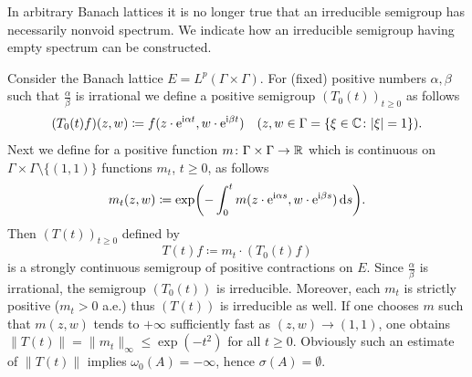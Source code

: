 In arbitrary Banach lattices it is no longer true that an irreducible semigroup has necessarily nonvoid spectrum.
We indicate how an irreducible semigroup having empty spectrum can be constructed.
\begin{example}\label{ex:c3-3.6}

Consider the Banach lattice $E = L^{p}(\Gamma\times\Gamma)$.
For (fixed) positive numbers $\alpha,\beta$ such that $\frac{\alpha}{\beta}$ is irrational we define a positive semigroup $(T_{0}(t))_{t\geq 0}$ as follows
\begin{equation}\label{eq:c3-3.9}
	(T_{0}(t)f)(z,w) \coloneq f(z\cdot \mathrm{e}^{\mathrm{i}\alpha t},w\cdot \mathrm{e}^{\mathrm{i}\beta t}) \quad (z,w \in \Gamma = \{\xi\in\mathbb{C} \colon |\xi|=1\}) .
\end{equation}
Next we define for a positive function $m \colon \Gamma\times\Gamma \to \mathbb{R} $ which is continuous on $\Gamma\times\Gamma\setminus\{(1,1)\}$ functions $m_{t}$, $t\geq 0$, as follows
\begin{equation}\label{eq:c3-3.10}
	m_{t}(z,w) \coloneq \exp\mleft(-\int_{0}^{t} m(z\cdot \eu^{\im\alpha s},w\cdot \eu^{\im\beta s})\ds \mright) .
\end{equation}
Then $(T(t))_{t\geq 0}$ defined by
\begin{equation}\label{eq:c3-3.11}
	T(t)f \coloneq m_{t}\cdot(T_{0}(t)f)
\end{equation}
is a strongly continuous semigroup of positive contractions on $E$.
Since $\frac{\alpha}{\beta}$ is irrational, the semigroup $(T_{0}(t))$ is irreducible.
Moreover, each $m_{t}$ is strictly positive (\ie  $m_{t} > 0$ a.e.) thus $(T(t))$ is irreducible as well.
If one chooses $m$ such that $m(z,w)$ tends to $+\infty$ sufficiently fast as $(z,w) \to (1,1)$, one obtains $\|T(t)\| = \|m_{t}\|_{\infty} \leq \exp(-t^{2})$ for all $t \geq 0$.
Obviously such an estimate of\/ $\|T(t)\|$ implies $\omega_0(A) = -\infty$, hence $\sigma(A) = \emptyset$.
\end{example}
